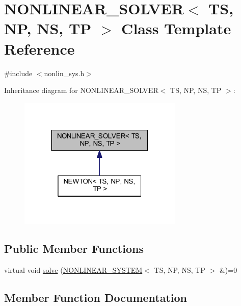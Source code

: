 \hypertarget{class_n_o_n_l_i_n_e_a_r___s_o_l_v_e_r}{}\section{N\+O\+N\+L\+I\+N\+E\+A\+R\+\_\+\+S\+O\+L\+V\+ER$<$ TS, NP, NS, TP $>$ Class Template Reference}
\label{class_n_o_n_l_i_n_e_a_r___s_o_l_v_e_r}


{\ttfamily \#include $<$nonlin\+\_\+sys.\+h$>$}



Inheritance diagram for N\+O\+N\+L\+I\+N\+E\+A\+R\+\_\+\+S\+O\+L\+V\+ER$<$ TS, NP, NS, TP $>$\+:\nopagebreak
\begin{figure}[H]
\begin{center}
\leavevmode
\includegraphics[width=221pt]{class_n_o_n_l_i_n_e_a_r___s_o_l_v_e_r__inherit__graph}
\end{center}
\end{figure}
\subsection*{Public Member Functions}
\begin{DoxyCompactItemize}
\item 
virtual void \mbox{\hyperlink{class_n_o_n_l_i_n_e_a_r___s_o_l_v_e_r_aae333fb75e2d5d8baa0e37991bfac7c4}{solve}} (\mbox{\hyperlink{class_n_o_n_l_i_n_e_a_r___s_y_s_t_e_m}{N\+O\+N\+L\+I\+N\+E\+A\+R\+\_\+\+S\+Y\+S\+T\+EM}}$<$ TS, NP, NS, TP $>$ \&)=0
\end{DoxyCompactItemize}


\subsection{Member Function Documentation}
\mbox{\label{class_n_o_n_l_i_n_e_a_r___s_o_l_v_e_r_aae333fb75e2d5d8baa0e37991bfac7c4}} 
